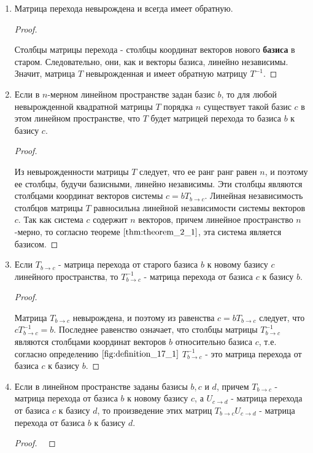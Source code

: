\begin{enumerate}[label={\arabic*°.}]
    \item Матрица перехода невырождена и всегда имеет обратную.
    \begin{proof}~

        Столбцы матрицы перехода - столбцы координат векторов нового \textbf{базиса} в старом. Следовательно, они, как и векторы базиса, линейно независимы. Значит, матрица $T$ невырожденная и имеет обратную матрицу $T^{-1}$.
    \end{proof}
    
    \item Если в $n$-мерном линейном пространстве задан базис $b$, то для любой невырожденной квадратной матрицы $T$ порядка $n$ существует такой базис $c$ в этом линейном пространстве, что $T$ будет матрицей перехода то базиса $b$ к базису $c$.
    \begin{proof}~

        Из невырожденности матрицы $T$ следует, что ее ранг ранг равен $n$, и поэтому ее столбцы, будучи базисными, линейно независимы. Эти столбцы являются столбцами координат векторов системы $c = bT_{b \to c}$. Линейная независимость столбцов матрицы $T$ равносильна линейной независимости системы векторов $c$. Так как система $c$ содержит $n$ векторов, причем линейное пространство $n$-мерно, то согласно теореме $\eqref{thm:theorem_2_1}$, эта система является базисом.
    \end{proof}
    
    \item Если $T_{b \to c}$ - матрица перехода от старого базиса $b$ к новому базису $c$ линейного пространства, то $T^{-1}_{b \to c}$ - матрица перехода от базиса $c$ к базису $b$.
    \begin{proof}~

        Матрица $T_{b \to c}$ невырождена, и поэтому из равенства $c = bT_{b \to c}$ следует, что $cT^{-1}_{b \to c} = b$. Последнее равенство означает, что столбцы матрицы $T^{-1}_{b \to c}$ являются столбцами координат векторов $b$ относительно базиса $c$, т.е. согласно определению $\eqref{fig:definition_17_1}$ $T^{-1}_{b \to c}$ - это матрица перехода от базиса $c$ к базису $b$.
    \end{proof}

    \item Если в линейном пространстве заданы базисы $b, c$ и $d$, причем $T_{b \to c}$ - матрица перехода от базиса $b$ к новому базису $c$, а $U_{c \to d}$ - матрица перехода от базиса $c$ к базису $d$, то произведение этих матриц $T_{b \to c}U_{c \to d}$ - матрица перехода от базиса $b$ к базису $d$.
    \begin{proof}~


\end{proof}
\end{enumerate}
